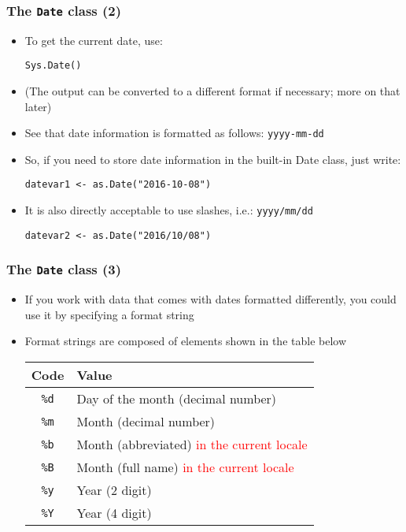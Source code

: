 \documentclass[10pt]{beamer}
\theoremstyle{definition}
\begin{document}
\begin{frame}[fragile]
\frametitle{The \texttt{Date} class (2)}
\begin{itemize}
	\item To get the current date, use:
	\begin{lstlisting}[style = rstyle, breaklines]
	Sys.Date()
	\end{lstlisting}
	\item (The output can be converted to a different format if necessary; more on that later)
	\item See that date information is formatted as follows: \texttt{yyyy-mm-dd}
	\item So, if you need to store date information in the built-in Date class, just write:
	\begin{lstlisting}[style = rstyle, breaklines]
	datevar1 <- as.Date("2016-10-08")
	\end{lstlisting}
	\item It is also directly acceptable to use slashes, i.e.: \texttt{yyyy/mm/dd}
	\begin{lstlisting}[style = rstyle, breaklines]
	datevar2 <- as.Date("2016/10/08")
	\end{lstlisting}
\end{itemize}
\end{frame}

\begin{frame}[fragile]
\frametitle{The \texttt{Date} class (3)}
\begin{itemize}
	\item If you work with data that comes with dates formatted differently, you could use it by specifying a format string 
	\item Format strings are composed of elements shown in the table below
	\bigskip	
	\begin{center}
	\begin{tabular}{cl}
	\toprule
	Code & Value\\
	\midrule
	\texttt{\%d} & Day of the month (decimal number)\\
	\texttt{\%m} & Month (decimal number)\\
	\texttt{\%b} & Month (abbreviated) \textcolor{red}{in the current locale}\\
	\texttt{\%B} & Month (full name) \textcolor{red}{in the current locale}\\
	\texttt{\%y} & Year (2 digit)\\
	\texttt{\%Y} & Year (4 digit)\\
	\bottomrule
	\end{tabular}
	\end{center}
\end{itemize}
\end{frame}
\end{document}
